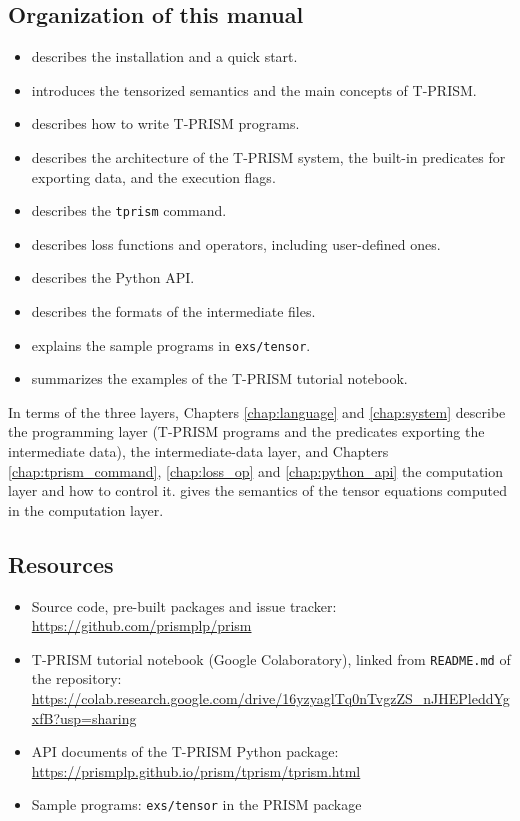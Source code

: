 \documentclass[a4paper]{report}
\begin{document}
\subsection*{Organization of this manual}
\begin{itemize}
	\item {} describes the installation and a quick start.
	\item {} introduces the tensorized semantics and the main concepts of T-PRISM.
	\item {} describes how to write T-PRISM programs.
	\item {} describes the architecture of the T-PRISM system, the built-in predicates for exporting data, and the execution flags.
	\item {} describes the {\tt tprism} command.
	\item {} describes loss functions and operators, including user-defined ones.
	\item {} describes the Python API.
	\item {} describes the formats of the intermediate files.
	\item {} explains the sample programs in {\tt exs/tensor}.
	\item {} summarizes the examples of the T-PRISM tutorial notebook.
\end{itemize}
In terms of the three layers, Chapters \ref{chap:language} and
\ref{chap:system} describe the programming layer (T-PRISM programs and the
predicates exporting the intermediate data), 
the intermediate-data layer, and Chapters \ref{chap:tprism_command},
\ref{chap:loss_op} and \ref{chap:python_api} the computation layer and how to
control it.   gives the semantics of the
tensor equations computed in the computation layer.

\subsection*{Resources}
\begin{itemize}
	\item Source code, pre-built packages and issue tracker: \url{https://github.com/prismplp/prism}
	\item T-PRISM tutorial notebook (Google Colaboratory), linked from {\tt README.md} of the repository: \\
	\url{https://colab.research.google.com/drive/16yzyaglTq0nTvgzZS_nJHEPleddYgxfB?usp=sharing}
	\item API documents of the T-PRISM Python package: \url{https://prismplp.github.io/prism/tprism/tprism.html}
	\item Sample programs: {\tt exs/tensor} in the PRISM package
\end{itemize}
\end{document}
